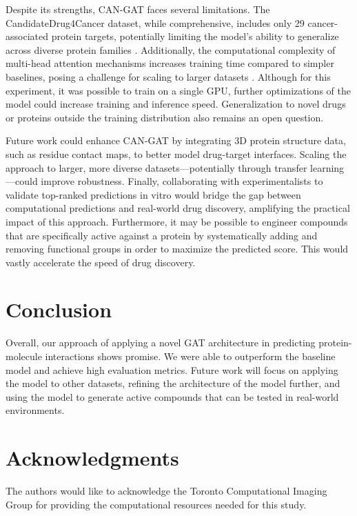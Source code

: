 \documentclass[fontsize=11pt]{article}
\begin{document}
Despite its strengths, CAN-GAT faces several limitations. The CandidateDrug4Cancer dataset, while comprehensive, includes only 29 cancer-associated protein targets, potentially limiting the model's ability to generalize across diverse protein families \cite{Ye2022}. Additionally, the computational complexity of multi-head attention mechanisms increases training time compared to simpler baselines, posing a challenge for scaling to larger datasets \cite{Kanakala2023}. Although for this experiment, it was possible to train on a single GPU, further optimizations of the model could increase training and inference speed. Generalization to novel drugs or proteins outside the training distribution also remains an open question. 

Future work could enhance CAN-GAT by integrating 3D protein structure data, such as residue contact maps, to better model drug-target interfaces. Scaling the approach to larger, more diverse datasets—potentially through transfer learning \cite{Ouyang2024}—could improve robustness. Finally, collaborating with experimentalists to validate top-ranked predictions in vitro would bridge the gap between computational predictions and real-world drug discovery, amplifying the practical impact of this approach. Furthermore, it may be possible to engineer compounds that are specifically active against a protein by systematically adding and removing functional groups in order to maximize the predicted score. This would vastly accelerate the speed of drug discovery.

\section*{Conclusion}
Overall, our approach of applying a novel GAT architecture in predicting protein-molecule interactions shows promise. We were able to outperform the baseline model and achieve high evaluation metrics. Future work will focus on applying the model to other datasets, refining the architecture of the model further, and using the model to generate active compounds that can be tested in real-world environments. 

\section*{Acknowledgments}
The authors would like to acknowledge the Toronto Computational Imaging Group for providing the computational resources needed for this study.
\printbibliography
\end{document}

